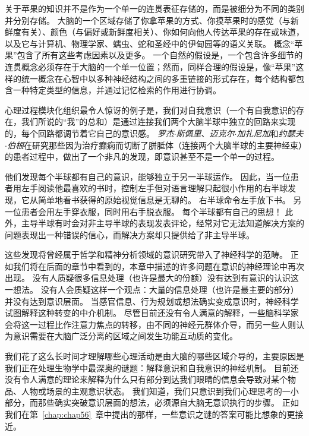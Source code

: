 关于苹果的知识并不是作为一个单一的连贯表征存储的，而是被细分为不同的类别并分别存储。
大脑的一个区域存储了你拿苹果的方式、你摸苹果时的感觉（与新鲜度有关）、颜色（与偏好或新鲜度相关）、你如何向他人传达苹果的存在或味道，以及它与计算机、物理学家、蠕虫、蛇和圣经中的伊甸园等的语义关联。
概念“苹果”包含了所有这些考虑因素以及更多。
一个自然的假设是，一个包含许多细节的连贯概念必须存在于大脑的一个单一位置；然而，同样合理的假设是，像“苹果”这样的统一概念在心智中以多种神经结构之间的多重链接的形式存在，每个结构都包含一种特定类型的信息，并通过记忆检索的作用进行协调。


心理过程模块化组织最令人惊讶的例子是，我们对自我意识（一个有自我意识的存在，我们所说的“我”的总和）是通过连接我们两个大脑半球中独立的回路来实现的，每个回路都调节着它自己的意识感。
\textit{罗杰$\cdot$斯佩里}、\textit{迈克尔$\cdot$加扎尼加}和\textit{约瑟夫$\cdot$伯根}在研究那些因为治疗癫痫而切断了胼胝体（连接两个大脑半球的主要神经束）的患者过程中，做出了一个非凡的发现，即意识甚至不是一个单一的过程。


他们发现每个半球都有自己的意识，能够独立于另一半球运作。
因此，当一位患者用左手阅读他最喜欢的书时，控制左手但对语言理解只起很小作用的右半球发现，它从简单地看书获得的原始视觉信息是无聊的。
右半球命令左手放下书。
另一位患者会用左手穿衣服，同时用右手脱衣服。
每个半球都有自己的思想！
此外，主导半球有时会对非主导半球的表现发表评论，经常对它无法知道解决方案的问题表现出一种错误的信心，而解决方案却只提供给了非主导半球。




这些发现将曾经属于哲学和精神分析领域的意识研究带入了神经科学的范畴。
正如我们将在后面的章节中看到的，本章中描述的许多问题在意识的神经理论中再次出现。
没有人质疑很多信息处理（也许是最大的份额）没有达到有意识的认识这一想法。
没有人会质疑这样一个观点：大量的信息处理（也许是最主要的部分）并没有达到意识层面。
当感官信息、行为规划或想法确实变成意识时，神经科学试图解释这种转变的中介机制。
尽管目前还没有令人满意的解释，一些脑科学家会将这一过程比作注意力焦点的转移，由不同的神经元群体介导，而另一些人则认为意识需要在大脑广泛分离的区域之间发生功能互动质的变化。




我们花了这么长时间才理解哪些心理活动是由大脑的哪些区域介导的，主要原因是我们正在处理生物学中最深奥的谜题：解释意识和自我意识的神经机制。
目前还没有令人满意的理论来解释为什么只有部分到达我们眼睛的信息会导致对某个物品、人物或场景的主观意识状态。
我们知道，我们只意识到我们心理思考的一小部分，而那些确实突破意识层面的想法，必须源自大脑无意识执行的步骤。
正如我们在第~\ref{chap:chap56}~章中提出的那样，一些意识之谜的答案可能比想象的更接近。


